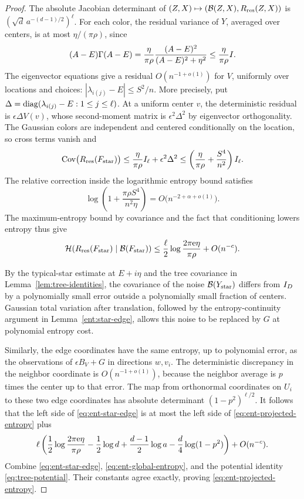 \begin{proof}
The absolute Jacobian determinant of
\((Z,X)\mapsto(\mathcal B(Z,X),R_{\rm res}(Z,X))\) is
\((\sqrt d\,a^{-(d-1)/2})^\ell\).
For each color, the residual variance of \(Y\), averaged over
centers, is at most \(\eta/(\pi\rho)\), since
\[
 (A-E)\Gamma(A-E)
 =\frac{\eta}{\pi\rho}
   \frac{(A-E)^2}{(A-E)^2+\eta^2}
 \le\frac{\eta}{\pi\rho}I.
\]
The eigenvector equations give a residual
\(O(n^{-1+o(1)})\) for \(V\), uniformly over locations and choices:
\(|\lambda_{i(j)}-E|\le S^2/n\).
More precisely, put
\(\Delta=\operatorname{diag}(\lambda_{i(j)}-E:1\le j\le\ell)\).
At a uniform center \(v\), the deterministic residual is
\(\epsilon\Delta V(v)\), whose second-moment matrix is
\(\epsilon^2\Delta^2\) by eigenvector orthogonality.
The Gaussian colors are independent and centered conditionally on
the location, so cross terms vanish and
\begin{equation}\label{eq:ent-residual-covariance}
 \operatorname{Cov}\bigl(R_{\rm res}(F_{\rm star})\bigr)
 \le \frac{\eta}{\pi\rho}I_\ell+\epsilon^2\Delta^2
 \le \left(\frac{\eta}{\pi\rho}+\frac{S^4}{n^2}\right)I_\ell.
\end{equation}
The relative correction inside the logarithmic entropy bound satisfies
\[
 \log\left(1+\frac{\pi\rho S^4}{n^2\eta}\right)
 =O\bigl(n^{-2+\alpha+o(1)}\bigr).
\]
The maximum-entropy bound by covariance and the fact that
conditioning lowers entropy thus give
\[
 \mathcal H(R_{\rm res}(F_{\rm star})\mid
                    \mathcal B(F_{\rm star}))
 \le \frac{\ell}{2}\log\frac{2\pi{\rm e}\eta}{\pi\rho}
          +O(n^{-c}).
\]

By the typical-star estimate at \(E+i\eta\) and the tree covariance
in Lemma~\ref{lem:tree-identities}, the covariance of the noise
\(\mathcal B(Y_{\rm star})\) differs from \(I_D\) by a polynomially
small error outside a polynomially small fraction of centers.
Gaussian total variation after translation, followed by the
entropy-continuity argument in Lemma~\ref{ent:star-edge}, allows this
noise to be replaced by \(G\) at polynomial entropy cost.

Similarly, the edge coordinates have the same entropy, up to
polynomial error, as the observations of \(\epsilon B_V+G\)
in directions \(w,v_i\). The deterministic discrepancy in the
neighbor coordinate is \(O(n^{-1+o(1)})\), because the neighbor
average is \(p\) times the center up to that error.
The map from orthonormal coordinates on \(U_i\) to these two
edge coordinates has absolute determinant \((1-p^2)^{\ell/2}\).
It follows that the left side of \eqref{eq:ent-star-edge} is at most
the left side of \eqref{eq:ent-projected-entropy} plus
\[
 \ell\left(
  \frac12\log\frac{2\pi{\rm e}\eta}{\pi\rho}
  -\frac12\log d+\frac{d-1}{2}\log a
                   -\frac d4\log(1-p^2)\right)+O(n^{-c}).
\]
Combine \eqref{eq:ent-star-edge},
\eqref{eq:ent-global-entropy}, and the potential identity
\eqref{eq:tree-potential}. Their constants agree exactly, proving
\eqref{eq:ent-projected-entropy}.


\end{proof}
